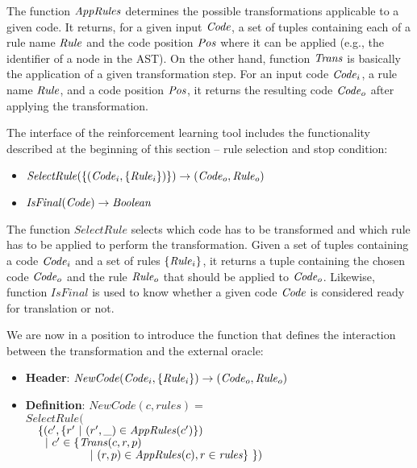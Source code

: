 \documentclass[svgnames,usenames,preprint,nocopyrightspace]{sigplanconf}
\begin{document}
The function $\mathit{AppRules}$ determines the possible transformations
applicable to a given code. It returns, for a given input $\mathit{Code}$, a
set of tuples containing each of a rule name $\mathit{Rule}$ and the code position $\mathit{Pos}$
where it can be applied (e.g., the identifier of a node in the AST). On the other hand, function $\mathit{Trans}$ is
basically the application of a given transformation step. For an input
code $\mathit{Code}_i$, a rule name $\mathit{Rule}$, and a code position $\mathit{Pos}$, it
returns the resulting code $\mathit{Code}_o$ after applying the
transformation.

The interface of the reinforcement learning tool includes the
functionality described at the beginning of this section -- rule
selection and stop condition:  

\newcommand{\SelectRule}{\mathit{SelectRule}}
\newcommand{\IsFinal}{\mathit{IsFinal}}
\newcommand{\Boolean}{\mathit{Boolean}}


\begin{itemize}
\item $\SelectRule(\{(\Code_i, \{\Rule_i\})\}) \rightarrow (\Code_o, \Rule_o)$
\item $\IsFinal(\Code) \rightarrow \Boolean$
\end{itemize}

The function $\SelectRule$ selects which code has to be transformed and
which rule has to be applied to perform the transformation.  Given a set of tuples containing a code
$\mathit{Code}_i$ and a set of rules $\{\mathit{Rule}_i\}$, it returns a tuple
containing the chosen code $\mathit{Code}_o$ and the rule $\mathit{Rule}_o$ that
should be applied to $\mathit{Code}_o$. Likewise, function $\IsFinal$ is used
to know whether a given code $\mathit{Code}$ is considered ready for translation or not.

We are now in a position  to introduce the function that defines the
interaction between the transformation and the external oracle:


\newcommand{\NewCode}{\mathit{NewCode}}
\newcommand{\rules}{\mathit{rules}}

\begin{itemize}
\item \textbf{Header}: $\NewCode(\Code_i, \{\Rule_i\}) \rightarrow
  (\Code_o, \Rule_o)$ 
\item \textbf{Definition}: $\NewCode(c, \rules) = $\\
$\SelectRule($\\
$~~~\{(c', \{r'~|~(r',\_) \in \mathit{AppRules}(c')\})$\\
$~~~ ~~|~ c' \in \{\mathit{Trans}(c, r, p)$\\
$~~~ ~~~ ~~~ ~~~ ~~~ ~~|~ (r, p) \in \AppRules(c), r \in \rules \} ~\})$\\
\end{itemize} 
\end{document}
